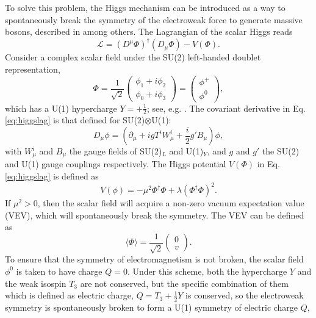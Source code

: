 \documentclass[a4paper,12pt]{article}
\begin{document}
To solve this problem, the Higgs mechanism can be introduced as a way to spontaneously break the symmetry of the electroweak force to generate massive bosons, described in \cite{higgs} among others. 
The Lagrangian of the scalar Higgs reads
\begin{equation}
    \label{eq:higgslag}
    \mathcal{L} = (D^\mu\Phi)^\dagger(D_\mu\Phi) - V(\Phi).
\end{equation}
Consider a complex scalar field under the SU(2) left-handed doublet representation,
\begin{equation}
    \label{eq:doubscal}
    \Phi = \frac{1}{\sqrt{2}}\begin{pmatrix}\phi_1+i\phi_2\\\phi_0+i\phi_3\end{pmatrix} = \begin{pmatrix} \phi^+\\\phi^0\end{pmatrix},
\end{equation}
which has a U(1) hypercharge $Y=+\frac12$; see, e.g. \cite{dono}.
The covariant derivative in Eq.\eqref{eq:higgslag} is that defined for SU(2)$\otimes$U(1):
\begin{equation}
    \label{eq:covarhiggs}
    D_\mu\phi = \left(\partial_\mu + igT^iW_\mu^i + \frac{i}{2}g'B_\mu\right)\phi,
\end{equation}
with $W^i_\mu$ and $B_\mu$ the gauge fields of SU(2)$_L$ and U(1)$_Y$, and $g$ and $g'$ the SU(2) and U(1) gauge couplings respectively. 
The Higgs potential $V(\Phi)$ in Eq.\eqref{eq:higgslag} is defined as
\begin{equation}
    \label{eq:goldpot}
    V(\phi) = -\mu^2\Phi^\dagger\Phi + \lambda(\Phi^\dagger\Phi)^2.
\end{equation}
If $\mu^2>0$, then the scalar field will acquire a non-zero vacuum expectation value (VEV), which will spontaneously break the symmetry. 
The VEV can be defined as
\begin{equation}
    \label{eq:vev}
    \langle\Phi\rangle = \frac{1}{\sqrt{2}}\begin{pmatrix}0\\v\end{pmatrix}.
\end{equation}
To ensure that the symmetry of electromagnetism is not broken, the scalar field $\phi^0$ is taken to have charge $Q=0$.
Under this scheme, both the hypercharge $Y$ and the weak isospin $T_3$ are not conserved, but the specific combination of them which is defined as electric charge, $Q=T_3+\frac12 Y$ is conserved, so the electroweak symmetry is spontaneously broken to form a U(1) symmetry of electric charge $Q$,
\end{document}
